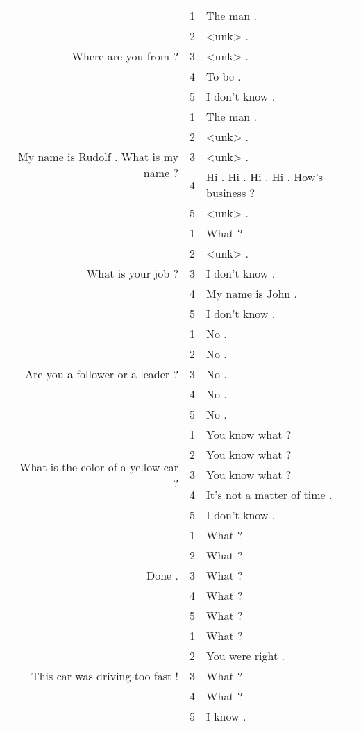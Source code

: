 \begin{longtable}{r|cl}
    \hline
    \multirow{5}{*}{Where are you from ?} & 1 & The man .\\
    & 2 & <unk> .\\
    & 3 & <unk> .\\
    & 4 & To be .\\
    & 5 & I don't know .\\

    \hline
    \multirow{5}{*}{My name is Rudolf . What is my name ?} & 1 & The man .\\
    & 2 & <unk> .\\
    & 3 & <unk> .\\
    & 4 & Hi . Hi . Hi . Hi . How's business ?\\
    & 5 & <unk> .\\

    \hline
    \multirow{5}{*}{What is your job ?} & 1 &  What ?\\
    & 2 & <unk> .\\
    & 3 & I don't know .\\
    & 4 & My name is John .\\
    & 5 & I don't know .\\

    \hline
    \multirow{5}{*}{Are you a follower or a leader ?} & 1 & No .\\
    & 2 & No .\\
    & 3 & No .\\
    & 4 & No .\\
    & 5 & No .\\

    \hline
    \multirow{5}{*}{What is the color of a yellow car ?} & 1 & You know what ?\\
    & 2 & You know what ?\\
    & 3 & You know what ?\\
    & 4 & It's not a matter of time .\\
    & 5 & I don't know .\\

    \hline
    \multirow{5}{*}{Done .} & 1 &  What ?\\
    & 2 & What ?\\
    & 3 & What ?\\
    & 4 & What ? \\
    & 5 & What ?\\

    \hline
    \multirow{5}{*}{This car was driving too fast !} & 1 &  What ?\\
    & 2 & You were right .\\
    & 3 & What ?\\
    & 4 & What ? \\
    & 5 & I know .\\

\end{longtable}


